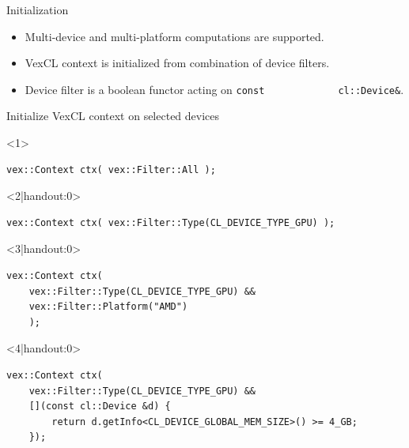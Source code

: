 \documentclass[@BEAMER_OPTIONS@]{beamer}
\newcommand{\code}[1]{\lstinline|#1|}
\begin{document}
\begin{frame}[fragile]{Initialization}
    \begin{itemize}
        \item Multi-device and multi-platform computations are supported.
        \item VexCL context is initialized from combination of device filters.
        \item Device filter is a boolean functor acting on \code{const
            cl::Device&}.
    \end{itemize}
    \vspace{-0.5\baselineskip}
    \begin{overlayarea}{\textwidth}{0.4\textheight}
    \begin{exampleblock}{Initialize VexCL context on selected devices}
        \begin{onlyenv}<1>
        \begin{lstlisting}
vex::Context ctx( vex::Filter::All );
        \end{lstlisting}
        \end{onlyenv}
        \begin{onlyenv}<2|handout:0>
        \begin{lstlisting}
vex::Context ctx( vex::Filter::Type(CL_DEVICE_TYPE_GPU) );
        \end{lstlisting}
        \end{onlyenv}
        \begin{onlyenv}<3|handout:0>
        \begin{lstlisting}
vex::Context ctx(
    vex::Filter::Type(CL_DEVICE_TYPE_GPU) &&
    vex::Filter::Platform("AMD")
    );
        \end{lstlisting}
        \end{onlyenv}
        \begin{onlyenv}<4|handout:0>
        \begin{lstlisting}
vex::Context ctx(
    vex::Filter::Type(CL_DEVICE_TYPE_GPU) &&
    [](const cl::Device &d) {
        return d.getInfo<CL_DEVICE_GLOBAL_MEM_SIZE>() >= 4_GB;
    });
        \end{lstlisting}
        \end{onlyenv}
    \end{exampleblock}
    \end{overlayarea}
    \begin{figure}
\end{figure}
\end{frame}
\end{document}
